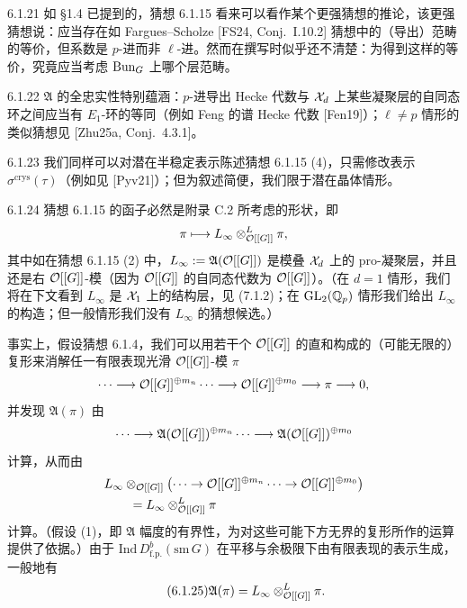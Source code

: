 \begin{rem}{6.1.21}\label{thm:a4-6-1-21}
如 §1.4 已提到的，猜想 6.1.15 看来可以看作某个更强猜想的推论，该更强猜想说：应当存在如 Fargues--Scholze [FS24, Conj.\ I.10.2] 猜想中的（导出）范畴的等价，但系数是 $p$-进而非 $\ell$-进。然而在撰写时似乎还不清楚：为得到这样的等价，究竟应当考虑 $\operatorname{Bun}_G$ 上哪个层范畴。
\end{rem}

\begin{rem}{6.1.22}\label{thm:a4-6-1-22}
$\mathfrak{A}$ 的全忠实性特别蕴涵：$p$-进导出 Hecke 代数与 $\mathcal{X}_d$ 上某些凝聚层的自同态环之间应当有 $E_1$-环的等同（例如 Feng 的谱 Hecke 代数 [Fen19]）；$\ell\neq p$ 情形的类似猜想见 [Zhu25a, Conj.\ 4.3.1]。
\end{rem}

\begin{rem}{6.1.23}\label{thm:a4-6-1-23}
我们同样可以对潜在半稳定表示陈述猜想 6.1.15 (4)，只需修改表示 $\sigma^{\mathrm{crys}}(\tau)$（例如见 [Pyv21]）；但为叙述简便，我们限于潜在晶体情形。
\end{rem}

\begin{rem}{6.1.24}\label{thm:a4-6-1-24}
猜想 6.1.15 的函子必然是附录 C.2 所考虑的形状，即
\[
\pi\longmapsto L_\infty\otimes^L_{\mathcal{O}[[G]]}\pi,
\]
其中如在猜想 6.1.15 (2) 中，$L_\infty:=\mathfrak{A}(\mathcal{O}[[G]])$ 是模叠 $\mathcal{X}_d$ 上的 pro-凝聚层，并且还是右 $\mathcal{O}[[G]]$-模（因为 $\mathcal{O}[[G]]$ 的自同态代数为 $\mathcal{O}[[G]]$）。（在 $d=1$ 情形，我们将在下文看到 $L_\infty$ 是 $\mathcal{X}_1$ 上的结构层，见 (7.1.2)；在 $\mathrm{GL}_2(\mathbb{Q}_p)$ 情形我们给出 $L_\infty$ 的构造；但一般情形我们没有 $L_\infty$ 的猜想候选。）

事实上，假设猜想 6.1.4，我们可以用若干个 $\mathcal{O}[[G]]$ 的直和构成的（可能无限的）复形来消解任一有限表现光滑 $\mathcal{O}[[G]]$-模 $\pi$
\[
\cdots\longrightarrow\mathcal{O}[[G]]^{\oplus m_n}\cdots\longrightarrow\mathcal{O}[[G]]^{\oplus m_0}\longrightarrow\pi\longrightarrow0,
\]
并发现 $\mathfrak{A}(\pi)$ 由
\[
\cdots\longrightarrow\mathfrak{A}(\mathcal{O}[[G]])^{\oplus m_n}\cdots\longrightarrow\mathfrak{A}(\mathcal{O}[[G]])^{\oplus m_0}
\]
计算，从而由
\[
\begin{aligned}
&L_\infty\otimes_{\mathcal{O}[[G]]}\bigl(\cdots\to\mathcal{O}[[G]]^{\oplus m_n}\cdots\to\mathcal{O}[[G]]^{\oplus m_0}\bigr)\\
&\qquad=L_\infty\otimes^L_{\mathcal{O}[[G]]}\pi
\end{aligned}
\]
计算。（假设 (1)，即 $\mathfrak{A}$ 幅度的有界性，为对这些可能下方无界的复形所作的运算提供了依据。）由于 $\mathrm{Ind}\,D^b_{\mathrm{f.p.}}(\mathrm{sm}\,G)$ 在平移与余极限下由有限表现的表示生成，一般地有
\begin{equation}\tag{6.1.25}\label{eq:a4-6-1-25}
\mathfrak{A}(\pi)=L_\infty\otimes^L_{\mathcal{O}[[G]]}\pi.
\end{equation}
\end{rem}

